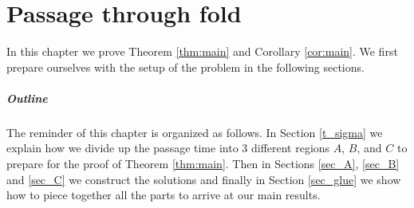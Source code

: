 \chapter{Passage through fold}
\label{thesis_p2}

In this chapter we prove Theorem \ref{thm:main} and Corollary \ref{cor:main}. We first prepare ourselves with the setup of the problem in the following sections.
 
\paragraph{Outline}
The reminder of this chapter is organized as follows. In Section \ref{t_sigma} we explain how we divide up the passage time into 3 different regions $A$, $B$, and $C$ to prepare for the proof of  Theorem \ref{thm:main}. Then in Sections \ref{sec_A}, \ref{sec_B} and \ref{sec_C} we construct the solutions and finally in Section \ref{sec_glue} we show how to piece together all the parts to arrive at our main results.


